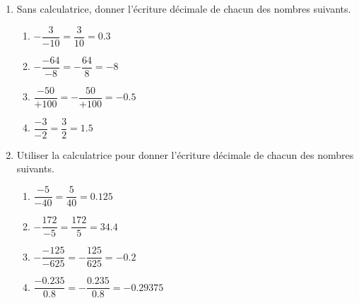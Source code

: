 \begin{corrige}
    \begin{enumerate}
      \item Sans calculatrice, donner l'écriture décimale de chacun des nombres suivants.
          \begin{enumerate}
            \item $-\dfrac{3}{-10}    = \dfrac{3}{10}      = \num{0.3}$
            \item $-\dfrac{-64}{-8}   = -\dfrac{64}{8}   = -8$
            \item $ \dfrac{-50}{+100} =  -\dfrac{50}{+100} = -\num{0.5}$
            \item $ \dfrac{-3}{-2}    =  \dfrac{3}{2}    = \num{1.5}$
          \end{enumerate}        
          \item Utiliser la calculatrice pour donner l'écriture décimale de chacun des nombres suivants.
          \begin{enumerate}
            \item $ \dfrac{-5}{-40}                 =  \dfrac{5}{40}                 = \num{0.125}$
            \item $-\dfrac{172}{-5}                 = \dfrac{172}{5}                 = \num{34.4}$
            \item $-\dfrac{-125}{-625}              = -\dfrac{125}{625}              = -\num{0.2}$
            \item $ \dfrac{-\num{0.235}}{\num{0.8}} =  -\dfrac{\num{0.235}}{\num{0.8}} = -\num{0.29375}$
          \end{enumerate}
    \end{enumerate}        
  \end{corrige}

